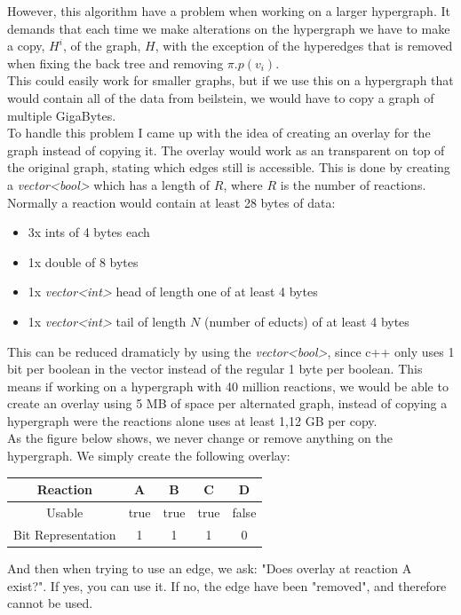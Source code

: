 \documentclass[a4paper,10pt,titlepage]{paper}
\begin{document}
However, this algorithm have a problem when working on a larger hypergraph. It demands that each time we make alterations on the hypergraph we have to make a copy, $H^i$, of the graph, $H$, with the exception of the hyperedges that is removed when fixing the back tree and removing $\pi.p(v_i)$.\\
This could easily work for smaller graphs, but if we use this on a hypergraph that would contain all of the data from beilstein, we would have to copy a graph of multiple GigaBytes. \\
To handle this problem I came up with the idea of creating an overlay for the graph instead of copying it. The overlay would work as an transparent on top of the original graph, stating which edges still is accessible. This is done by creating a \textit{vector<bool>} which has a length of $R$, where $R$ is the number of reactions. Normally a reaction would contain at least 28 bytes of data:
\begin{itemize}
\item
3x ints of 4 bytes each
\item
1x double of 8 bytes
\item
1x \textit{vector<int>} head of length one of at least 4 bytes
\item
1x \textit{vector<int>} tail of length $N$ (number of educts) of at least 4 bytes
\end{itemize}
This can be reduced dramaticly by using the \textit{vector<bool>}, since c++ only uses 1 bit per boolean in the vector instead of the regular 1 byte per boolean.\cite{VectorBool} This means if working on a hypergraph with 40 million reactions, we would be able to create an overlay using 5 MB of space per alternated graph, instead of copying a hypergraph were the reactions alone uses at least 1,12 GB per copy. \\
As the figure below shows, we never change or remove anything on the hypergraph. We simply create the following overlay:
\begin{table}[H]
\centering
\begin{tabular}{c|c|c|c|c}
Reaction & A & B & C & D \\\hline
Usable & true & true & true & false \\\hline
Bit Representation & 1 & 1 & 1 & 0
\end{tabular}
\end{table} 
And then when trying to use an edge, we ask: "Does overlay at reaction A exist?". If yes, you can use it. If no, the edge have been "removed", and therefore cannot be used.
\end{document}
